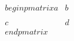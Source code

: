 \documentclass[preview]{standalone}
\begin{document}
\begin{align*}
\quad\\begin{pmatrix} a & b \quad\\\quad\\ c & d \quad\\end{pmatrix}
\end{align*}
\end{document}
